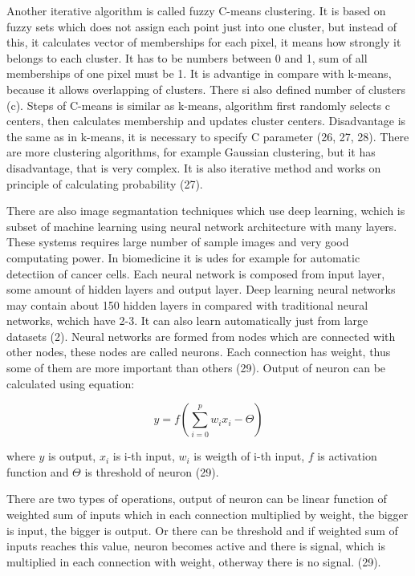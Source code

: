 \documentclass[a4paper,12pt]{article}   %
\numberwithin{equation}{section}        %
\begin{document}
        Another iterative algorithm is called fuzzy C-means clustering. It is based on fuzzy sets which does not assign each point just into one cluster, but instead of this,
        it calculates vector of memberships for each pixel, it means how strongly it belongs to each cluster. It has to be numbers between 0 and 1, sum of all memberships of one pixel must be 1.
        It is advantige in compare with k-means, because it allows overlapping of clusters. There si also defined number of clusters (c). Steps of C-means is similar as k-means,
        algorithm first randomly selects c centers, then calculates membership and updates cluster centers. Disadvantage is the same as in k-means,
        it is necessary to specify C parameter (26, 27, 28). There are more clustering algorithms, for example Gaussian clustering, but it has disadvantage, that is very complex.
        It is also iterative method and works on principle of calculating probability (27).

        There are also image segmantation techniques which use deep learning, wchich is subset of machine learning using neural network architecture with many layers.
        These systems requires large number of sample images and very good computating power. In biomedicine it is udes for example for automatic detectiion of cancer cells.
        Each neural network is composed from input layer, some amount of hidden layers and output layer. Deep learning neural networks may contain about 150 hidden layers
        in compared with traditional neural networks, wchich have 2-3. It can also learn automatically just from large datasets (2). Neural networks are formed from
        nodes which are connected with other nodes, these nodes are called neurons. Each connection has weight, thus some of them are more important than others (29).
        Output of neuron can be calculated using equation:

        \begin{equation}
            y = f(\sum_{i=0}^{p} w_i x_i - \Theta)
        \end{equation}

        where \(y\) is output, \(x_i\) is i-th input, \(w_i\) is weigth of i-th input, \(f\) is activation function and \(\Theta\) is threshold of neuron (29).

        There are two types of operations, output of neuron can be linear function of weighted sum of inputs which in each connection multiplied by weight, the bigger is input,
        the bigger is output. Or there can be threshold and if weighted sum of inputs reaches this value, neuron becomes active and there is signal, which is multiplied in each
        connection with weight, otherway there is no signal. (29).
\end{document}
